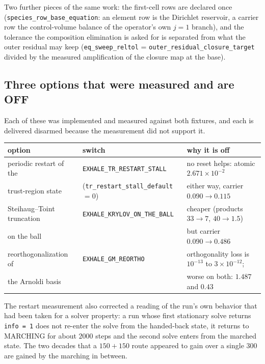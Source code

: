 \documentclass[english,a4paper]{my_memo}
\newcommand{\code}[1]{\texttt{#1}}
\begin{document}
Two further pieces of the same work: the first-cell rows are declared once
(\code{species\_row\_base\_equation}: an element row is the Dirichlet
reservoir, a carrier row the control-volume balance of the operator's own
$j = 1$ branch), and the tolerance the composition elimination is asked for
is separated from what the outer residual may keep
(\code{eq\_sweep\_reltol} = \code{outer\_residual\_closure\_target} divided by
the measured amplification of the closure map at the base).

\subsection{Three options that were measured and are OFF}
\label{sec:armsoff}

Each of these was implemented and measured against both fixtures, and each is
delivered disarmed because the measurement did not support it.

\begin{center}\small
\begin{tabular}{@{}lll@{}}
\toprule
option & switch & why it is off \\
\midrule
periodic restart of the & \code{EXHALE\_TR\_RESTART\_STALL} &
  no reset helps: atomic $2.671\times10^{-2}$ \\
trust-region state & (\code{tr\_restart\_stall\_default} $=0$) &
  either way, carrier $0.090 \rightarrow 0.115$ \\
\addlinespace
Steihaug--Toint truncation & \code{EXHALE\_KRYLOV\_ON\_THE\_BALL} &
  cheaper (products $33\rightarrow7$, $40\rightarrow1.5$) \\
on the ball & &
  but carrier $0.090 \rightarrow 0.486$ \\
\addlinespace
reorthogonalization of & \code{EXHALE\_GM\_REORTHO} &
  orthogonality loss is $10^{-13}$ to $3\times10^{-12}$; \\
the Arnoldi basis & &
  worse on both: $1.487$ and $0.43$ \\
\bottomrule
\end{tabular}
\end{center}

\noindent The restart measurement also corrected a reading of the run's own
behavior that had been taken for a solver property: a run whose first
stationary solve returns \code{info = 1} does not re-enter the solve from the
handed-back state, it returns to MARCHING for about $2000$ steps and the
second solve enters from the marched state. The two decades that a
$150 + 150$ route appeared to gain over a single $300$ are gained by the
marching in between.
\end{document}
